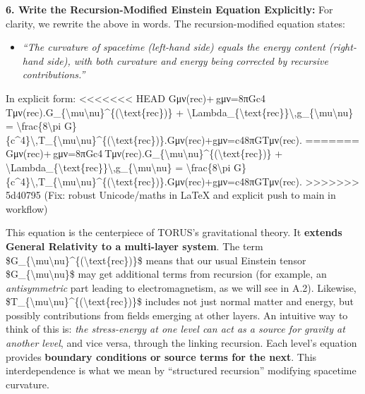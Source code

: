 \documentclass[]{article}
\begin{document}
\textbf{6. Write the Recursion-Modified Einstein Equation Explicitly:}
For clarity, we rewrite the above in words. The recursion-modified
equation states​:

\begin{itemize}
\item
  \emph{``The curvature of spacetime (left-hand side) equals the energy
  content (right-hand side), with both curvature and energy being
  corrected by recursive contributions.''}
\end{itemize}

In explicit form:
<<<<<<< HEAD
Gμν(rec)+\Lambdarec gμν=8πGc4 Tμν(rec).G\_\{\textbackslash mu\textbackslash nu\}\^{}\{(\textbackslash text\{rec\})\}
+
\textbackslash Lambda\_\{\textbackslash text\{rec\}\}\textbackslash,g\_\{\textbackslash mu\textbackslash nu\}
= \textbackslash frac\{8\textbackslash pi
G\}\{c\^{}4\}\textbackslash,T\_\{\textbackslash mu\textbackslash nu\}\^{}\{(\textbackslash text\{rec\})\}.Gμν(rec)\hspace{0pt}+\Lambdarec\hspace{0pt}gμν\hspace{0pt}=c48πG\hspace{0pt}Tμν(rec)\hspace{0pt}.
=======
Gμν(rec)+\Lambdarec gμν=8πGc4 Tμν(rec).G\_\{\textbackslash{}mu\textbackslash{}nu\}\^{}\{(\textbackslash{}text\{rec\})\}
+
\textbackslash{}Lambda\_\{\textbackslash{}text\{rec\}\}\textbackslash{},g\_\{\textbackslash{}mu\textbackslash{}nu\}
= \textbackslash{}frac\{8\textbackslash{}pi
G\}\{c\^{}4\}\textbackslash{},T\_\{\textbackslash{}mu\textbackslash{}nu\}\^{}\{(\textbackslash{}text\{rec\})\}.Gμν(rec)​+\Lambdarec​gμν​=c48πG​Tμν(rec)​.
>>>>>>> 5d40795 (Fix: robust Unicode/maths in LaTeX and explicit push to main in workflow)

This equation is the centerpiece of TORUS's gravitational theory. It
\textbf{extends General Relativity to a multi-layer system}. The term
\$G\_\{\textbackslash{}mu\textbackslash{}nu\}\^{}\{(\textbackslash{}text\{rec\})\}\$
means that our usual Einstein tensor
\$G\_\{\textbackslash{}mu\textbackslash{}nu\}\$ may get additional terms
from recursion (for example, an \emph{antisymmetric} part leading to
electromagnetism, as we will see in A.2). Likewise,
\$T\_\{\textbackslash{}mu\textbackslash{}nu\}\^{}\{(\textbackslash{}text\{rec\})\}\$
includes not just normal matter and energy, but possibly contributions
from fields emerging at other layers. An intuitive way to think of this
is: \emph{the stress-energy at one level can act as a source for gravity
at another level}, and vice versa, through the linking recursion. Each
level's equation provides \textbf{boundary conditions or source terms
for the next}​. This interdependence is what we mean by ``structured
recursion'' modifying spacetime curvature.
\end{document}

